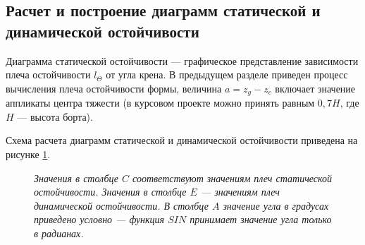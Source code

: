 \subsection{Расчет и построение диаграмм статической и динамической остойчивости}

Диаграмма статической остойчивости --- графическое представление зависимости плеча остойчивости $l_{\Theta}$ от угла крена.
В предыдущем разделе приведен процесс вычисления плеча остойчивости формы, величина $a = z_g-z_c$ включает значение аппликаты центра тяжести (в курсовом проекте можно принять равным $0,7 H$, где $H$ --- высота борта).

Схема расчета диаграмм статической и динамической остойчивости приведена на рисунке \ref{fig:stability-curve-calculation}.

\begin{figure}
    \centering
    \footnotesize
    \caption{Схема расчета диаграмм статической и динамической остойчивости в табличном редакторе}
    \caption*{\textit{Значения в столбце $C$ соответствуют значениям плеч статической остойчивости.
    Значения в столбце $E$ --- значениям плеч динамической остойчивости.
    В столбце $A$ значение угла в градусах приведено условно --- функция $SIN$ принимает значение угла только в радианах.}}
    \label{fig:stability-curve-calculation}
\end{figure}

